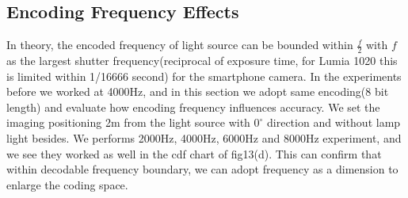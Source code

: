 \documentclass[conference]{IEEEtran}
\begin{document}
\subsection{\textbf{Encoding Frequency Effects}}
In theory, the encoded frequency of light source can be bounded within $\frac{f}{2}$ with $f$ as the largest shutter frequency(reciprocal of exposure time, for Lumia 1020 this is limited within 1/16666 second) for the smartphone camera. In the experiments before we worked at 4000Hz, and in this section we adopt same encoding(8 bit length) and evaluate how encoding frequency influences accuracy. We set the imaging positioning 2m from the light source with $0^{\circ}$ direction and without lamp light besides. We performs 2000Hz, 4000Hz, 6000Hz and 8000Hz experiment, and we see they worked as well in the cdf chart of fig13(d). This can confirm that within decodable frequency boundary, we can adopt frequency as a dimension to enlarge the coding space.



\begin{figure}
	\footnotesize
\end{figure}
\end{document}
